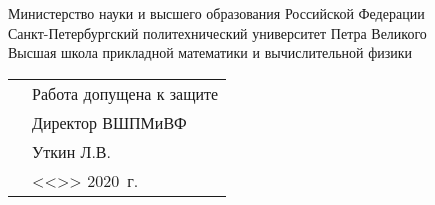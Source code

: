 \thispagestyle{empty}%
\makeatletter
{}
%
\makeatother



{\centering%
	Министерство науки и высшего образования Российской Федерации\\
	Санкт-Петербургский политехнический университет Петра Великого\\
	{%
	Высшая школа прикладной математики и вычислительной физики}
\par}%


\vspace{0pt plus1fill} %


\noindent
\begin{minipage}{\linewidth}
	\vspace{\mfloatsep} %
	\begin{tabularx}{\linewidth}{Xl}
	&Работа допущена к защите     \\
	&Директор ВШПМиВФ     \\			
	&\underline{\hspace*{0.1\textheight}} Уткин Л.В.    \\
	&<<\underline{\hspace*{0.05\textheight}}>> \underline{\hspace*{0.1\textheight}} 2020~г.  \\ 
	\end{tabularx}
	\vspace{\mfloatsep} %
\end{minipage}


\vspace{0pt plus2fill} %


